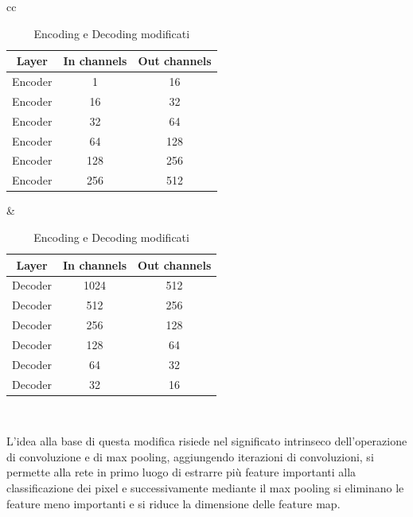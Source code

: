 \begin{table}[!ht]
	\begin{adjustbox}{width=\columnwidth,center}
		\begin{tabular}{cc}
			\begin{tabular}{|c|c|c|}
				\hline
				\textbf{Layer} & \textbf{In channels} & \textbf{Out channels} \\
				\hline
				\hline
				Encoder        & 1                    & 16                    \\
				\hline
				Encoder        & 16                   & 32                    \\
				\hline
				Encoder        & 32                   & 64                    \\
				\hline
				Encoder        & 64                   & 128                   \\
				\hline
				Encoder        & 128                  & 256                   \\
				\hline
				Encoder        & 256                  & 512                   \\
				\hline
			\end{tabular}
			 &
			\begin{tabular}{|c|c|c|}
				\hline
				\textbf{Layer} & \textbf{In channels} & \textbf{Out channels} \\
				\hline
				\hline
				Decoder        & 1024                 & 512                   \\
				\hline
				Decoder        & 512                  & 256                   \\
				\hline
				Decoder        & 256                  & 128                   \\
				\hline
				Decoder        & 128                  & 64                    \\
				\hline
				Decoder        & 64                   & 32                    \\
				\hline
				Decoder        & 32                   & 16                    \\
				\hline
			\end{tabular} \\
		\end{tabular}
	\end{adjustbox}
	\caption{Encoding e Decoding modificati}
	\label{tab:encoding_modificato}
\end{table}

L'idea alla base di questa modifica risiede nel significato intrinseco dell'operazione di convoluzione e di max pooling, 
aggiungendo iterazioni di convoluzioni, si permette alla rete in primo 
luogo di estrarre più feature importanti alla classificazione dei pixel e successivamente mediante il max pooling
si eliminano le feature meno importanti e si riduce la dimensione delle feature map.



